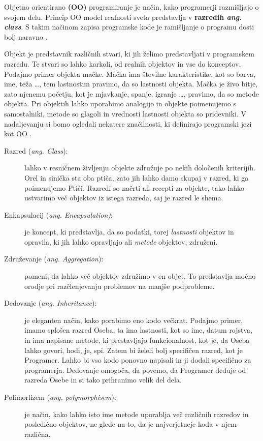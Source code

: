 
Objetno orientirano \textbf{(OO)} programiranje je način, kako
programerji razmišljajo o svojem delu. Princip OO model realnosti
sveta predstavlja v \textbf{razredih \emph{ang. class}}. S takim
načinom zapisa programske kode je ramišljanje o programu dosti bolj
naravno \cite{shaums}.

Objekt je predstavnik različnih stvari, ki jih želimo predstavljati v
programskem razredu. Te stvari so lahko karkoli, od realnih objektov
in vse do konceptov. Podajmo primer objekta mačke. Mačka ima številne
karakteristike, kot so barva, ime, teža \dots, tem lastnostim pravimo,
da so lastnosti objekta. Mačka je živo bitje, zato njenemu početju,
kot je mjavkanje, spanje, igranje \dots, pravimo, da so metode
objekta. Pri objektih lahko uporabimo analogijo in objekte poimenujemo
s samostalniki, metode so glagoli in vrednosti lastnosti objekta so
pridevniki. V nadaljevanju si bomo ogledali nekatere značilnosti, ki
definirajo programski jezi kot OO \cite{OO-JS}.

\begin{description}
\item[Razred (\emph{ang. Class}):] lahko v resničnem življenju objekte
  združuje po nekih določenih kriterijih. Orel in sinička sta oba
  ptiča, zato jih lahko damo skupaj v razred, ki ga poimenujemo
  Ptiči. Razredi so načrti ali recepti za objekte, tako lahko
  ustvarimo več objektov iz istega razreda, saj je razred le shema.
\item [Enkapsulacij (\emph{ang. Encapsulation)}:] je koncept, ki
  predstavlja, da so podatki, torej \emph{lastnosti} objektov in
  opravila, ki jih lahko opravljajo ali \emph{metode} objektov,
  združeni.
\item [Združevanje (\emph{ang. Aggregation}):] pomeni, da lahko več
  objektov združimo v en objet. To predstavlja močno orodje pri
  razčlenjevanju problemov na manjše podprobleme.
\item [Dedovanje (\emph{ang. Inheritance}):] je eleganten način, kako
  porabimo eno kodo večkrat. Podajmo primer, imamo splošen razred
  Oseba, ta ima lastnosti, kot so ime, datum rojstva, in ima napisane
  metode, ki prestavljajo funkcionalnost, kot je, da Oseba lahko
  govori, hodi, je, spi. Zatem bi želeli bolj specifičen razred, kot je
  Programer. Lahko bi vso kodo ponovno napisali in ji dodali
  specifično za programerja. Dedovanje omogoča, da povemo, da Programer
  deduje od razreda Osebe in si tako prihranimo velik del dela.
\item [Polimorfizem (\emph{ang. polymorphisem}):] je način, kako lahko
  isto ime metode uporablja več različnih razredov in posledično
  objektov, ne glede na to, da je najverjetneje koda v njem
  različna.
\end{description}

